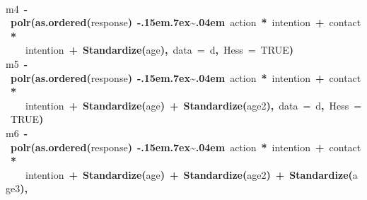 \documentclass{article}
\makeatletter
\newcommand{\hlnumber}[1]{\textcolor[rgb]{0,0,0}{#1}}%
\newcommand{\hlfunctioncall}[1]{\textcolor[rgb]{.5,0,.33}{\textbf{#1}}}%
\newcommand{\hlkeyword}[1]{\textbf{#1}}%
\newcommand{\hlargument}[1]{\textcolor[rgb]{.69,.25,.02}{#1}}%
\newcommand{\hlassignement}[1]{\textbf{#1}}%
\newcommand{\hlsymbol}[1]{#1}%
\def\urltilda{\kern -.15em\lower .7ex\hbox{\~{}}\kern .04em}%
\newcommand{\hlstd}[1]{\textcolor[rgb]{0,0,0}{#1}}%
\newenvironment{kframe}{%
 \def\FrameCommand##1{\hskip\@totalleftmargin \hskip-\fboxsep
 \colorbox{shadecolor}{##1}\hskip-\fboxsep
     \hskip-\linewidth \hskip-\@totalleftmargin \hskip\columnwidth}%
 \MakeFramed {\advance\hsize-\width
   \@totalleftmargin\z@ \linewidth\hsize
   \@setminipage}}%
 {\par\unskip\endMakeFramed}
\newenvironment{knitrout}{}{} %
\makeatother
\begin{document}
\begin{knitrout}
{\begin{kframe}
\begin{flushleft}
\hlstd{}\hspace*{\fill}\\
\hlstd{}\hlsymbol{m4}{\ }\hlassignement{\usebox{\hlnormalsizeboxlessthan}-}{\ }\hlfunctioncall{polr}\hlkeyword{(}\hlfunctioncall{as.ordered}\hlkeyword{(}\hlsymbol{response}\hlkeyword{)}{\ }\hlkeyword{\urltilda{}}{\ }\hlsymbol{action}{\ }\hlkeyword{*}{\ }\hlsymbol{intention}{\ }\hlkeyword{+}{\ }\hlsymbol{contact}{\ }\hlkeyword{*}\hspace*{\fill}\\
\hlstd{}{\ }{\ }{\ }{\ }\hlsymbol{intention}{\ }\hlkeyword{+}{\ }\hlfunctioncall{Standardize}\hlkeyword{(}\hlsymbol{age}\hlkeyword{)}\hlkeyword{,}{\ }\hlargument{data}{\ }\hlargument{=}{\ }\hlsymbol{d}\hlkeyword{,}{\ }\hlargument{Hess}{\ }\hlargument{=}{\ }\hlnumber{TRUE}\hlkeyword{)}\hspace*{\fill}\\
\hlstd{}\hlsymbol{m5}{\ }\hlassignement{\usebox{\hlnormalsizeboxlessthan}-}{\ }\hlfunctioncall{polr}\hlkeyword{(}\hlfunctioncall{as.ordered}\hlkeyword{(}\hlsymbol{response}\hlkeyword{)}{\ }\hlkeyword{\urltilda{}}{\ }\hlsymbol{action}{\ }\hlkeyword{*}{\ }\hlsymbol{intention}{\ }\hlkeyword{+}{\ }\hlsymbol{contact}{\ }\hlkeyword{*}\hspace*{\fill}\\
\hlstd{}{\ }{\ }{\ }{\ }\hlsymbol{intention}{\ }\hlkeyword{+}{\ }\hlfunctioncall{Standardize}\hlkeyword{(}\hlsymbol{age}\hlkeyword{)}{\ }\hlkeyword{+}{\ }\hlfunctioncall{Standardize}\hlkeyword{(}\hlsymbol{age}\hlkeyword{\usebox{\hlnormalsizeboxhat}}\hlnumber{2}\hlkeyword{)}\hlkeyword{,}{\ }\hlargument{data}{\ }\hlargument{=}{\ }\hlsymbol{d}\hlkeyword{,}{\ }\hlargument{Hess}{\ }\hlargument{=}{\ }\hlnumber{TRUE}\hlkeyword{)}\hspace*{\fill}\\
\hlstd{}\hlsymbol{m6}{\ }\hlassignement{\usebox{\hlnormalsizeboxlessthan}-}{\ }\hlfunctioncall{polr}\hlkeyword{(}\hlfunctioncall{as.ordered}\hlkeyword{(}\hlsymbol{response}\hlkeyword{)}{\ }\hlkeyword{\urltilda{}}{\ }\hlsymbol{action}{\ }\hlkeyword{*}{\ }\hlsymbol{intention}{\ }\hlkeyword{+}{\ }\hlsymbol{contact}{\ }\hlkeyword{*}\hspace*{\fill}\\
\hlstd{}{\ }{\ }{\ }{\ }\hlsymbol{intention}{\ }\hlkeyword{+}{\ }\hlfunctioncall{Standardize}\hlkeyword{(}\hlsymbol{age}\hlkeyword{)}{\ }\hlkeyword{+}{\ }\hlfunctioncall{Standardize}\hlkeyword{(}\hlsymbol{age}\hlkeyword{\usebox{\hlnormalsizeboxhat}}\hlnumber{2}\hlkeyword{)}{\ }\hlkeyword{+}{\ }\hlfunctioncall{Standardize}\hlkeyword{(}\hlsymbol{age}\hlkeyword{\usebox{\hlnormalsizeboxhat}}\hlnumber{3}\hlkeyword{)}\hlkeyword{,}\hspace*{\fill}\\

\end{flushleft}
\end{kframe}}
\end{knitrout}
\end{document}
